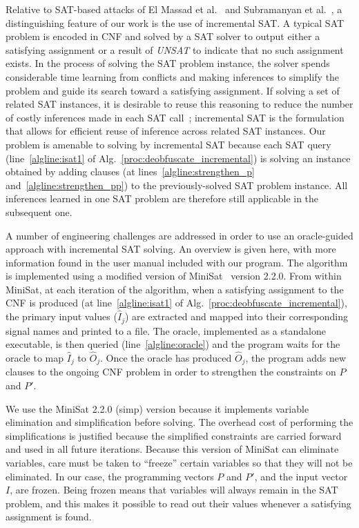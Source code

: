 \documentclass[proposal]{umassthesis}  %
\begin{document}
Relative to SAT-based attacks of El Massad et al.~\cite{elmassad-15} and Subramanyan et al.~\cite{subramanyan-15}, a distinguishing feature of our work is the use of incremental SAT. A typical SAT problem is encoded in CNF and solved by a SAT solver to output either a satisfying assignment or a result of \textit{UNSAT} to indicate that no such assignment exists. In the process of solving the SAT problem instance, the solver spends considerable time learning from conflicts and making inferences to simplify the problem and guide its search toward a satisfying assignment. If solving a set of related SAT instances, it is desirable to reuse this reasoning to reduce the number of costly inferences made in each SAT call~\cite{een2003temporal}; incremental SAT is the formulation that allows for efficient reuse of inference across related SAT instances. Our problem is amenable to solving by incremental SAT because each SAT query (line~\ref{algline:isat1} of Alg.~\ref{proc:deobfuscate_incremental}) is solving an instance obtained by adding clauses (at lines~\ref{algline:strengthen_p} and~\ref{algline:strengthen_pp}) to the previously-solved SAT problem instance. All inferences learned in one SAT problem are therefore still applicable in the subsequent one. 

A number of engineering challenges are addressed in order to use an oracle-guided approach with incremental SAT solving. An overview is given here, with more information found in the user manual included with our program. The algorithm is implemented using a modified version of MiniSat~\cite{een-04} version 2.2.0. From within MiniSat, at each iteration of the algorithm, when a satisfying assignment to the CNF is produced (at line~\ref{algline:isat1} of Alg.~\ref{proc:deobfuscate_incremental}), the primary input values ($\widehat{I}_j$) are extracted and mapped into their corresponding signal names and printed to a file. The oracle, implemented as a standalone executable, is then queried (line~\ref{algline:oracle}) and the program waits for the oracle to map $\widehat{I}_j$ to $\widehat{O}_j$. Once the oracle has produced $\widehat{O}_j$, the program adds new clauses to the ongoing CNF problem in order to strengthen the constraints on $P$ and $P'$.

We use the MiniSat 2.2.0 (simp) version because it implements variable elimination and simplification before solving. The overhead cost of performing the simplifications is justified because the simplified constraints are carried forward and used in all future iterations. Because this version of MiniSat can eliminate variables, care must be taken to ``freeze'' certain variables so that they will not be eliminated. In our case, the programming vectors $P$ and $P'$, and the input vector $I$, are frozen. Being frozen means that variables will always remain in the SAT problem, and this makes it possible to read out their values whenever a satisfying assignment is found.
\end{document}
